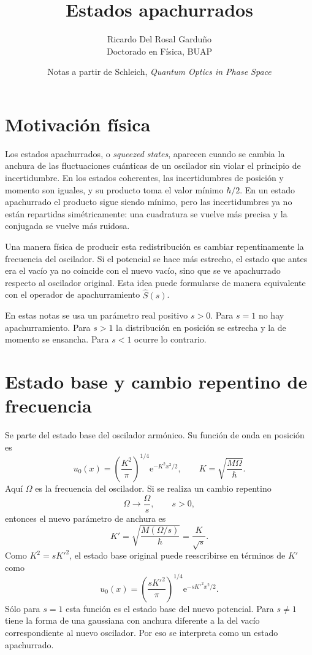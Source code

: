 \documentclass[11pt]{article}
\title{Estados apachurrados}
\author{Ricardo Del Rosal Gardu\~no \\ \small Doctorado en F\'isica, BUAP}
\date{Notas a partir de Schleich, \emph{Quantum Optics in Phase Space}}
\newcommand{\ee}{\mathrm{e}}
\begin{document}
\maketitle

\section{Motivaci\'on f\'isica}

Los estados apachurrados, o \emph{squeezed states}, aparecen cuando se cambia
la anchura de las fluctuaciones cu\'anticas de un oscilador sin violar el
principio de incertidumbre. En los estados coherentes, las incertidumbres de
posici\'on y momento son iguales, y su producto toma el valor m\'inimo
$\hbar/2$. En un estado apachurrado el producto sigue siendo m\'inimo, pero
las incertidumbres ya no est\'an repartidas sim\'etricamente: una cuadratura se
vuelve m\'as precisa y la conjugada se vuelve m\'as ruidosa.

Una manera f\'isica de producir esta redistribuci\'on es cambiar
repentinamente la frecuencia del oscilador. Si el potencial se hace m\'as
estrecho, el estado que antes era el vac\'io ya no coincide con el nuevo
vac\'io, sino que se ve apachurrado respecto al oscilador original. Esta idea
puede formularse de manera equivalente con el operador de apachurramiento
$\hat S(s)$.

En estas notas se usa un par\'ametro real positivo $s>0$. Para $s=1$ no hay
apachurramiento. Para $s>1$ la distribuci\'on en posici\'on se estrecha y la de
momento se ensancha. Para $s<1$ ocurre lo contrario.

\section{Estado base y cambio repentino de frecuencia}

Se parte del estado base del oscilador arm\'onico. Su funci\'on de onda en
posici\'on es
\begin{equation}
  u_0(x)
  =
  \left(\frac{K^2}{\pi}\right)^{1/4}
  \ee^{-K^2x^2/2},
  \qquad
  K=\sqrt{\frac{M\Omega}{\hbar}}.
\end{equation}
Aqu\'i $\Omega$ es la frecuencia del oscilador. Si se realiza un cambio
repentino
\begin{equation}
  \Omega\longrightarrow \frac{\Omega}{s},
  \qquad s>0,
\end{equation}
entonces el nuevo par\'ametro de anchura es
\begin{equation}
  K'=\sqrt{\frac{M(\Omega/s)}{\hbar}}
  =
  \frac{K}{\sqrt{s}}.
\end{equation}
Como $K^2=sK'^2$, el estado base original puede reescribirse en t\'erminos de
$K'$ como
\begin{equation}
  u_0(x)
  =
  \left(\frac{sK'^2}{\pi}\right)^{1/4}
  \ee^{-sK'^2x^2/2}.
\end{equation}
S\'olo para $s=1$ esta funci\'on es el estado base del nuevo potencial. Para
$s\neq1$ tiene la forma de una gaussiana con anchura diferente a la del
vac\'io correspondiente al nuevo oscilador. Por eso se interpreta como un
estado apachurrado.
\end{document}
